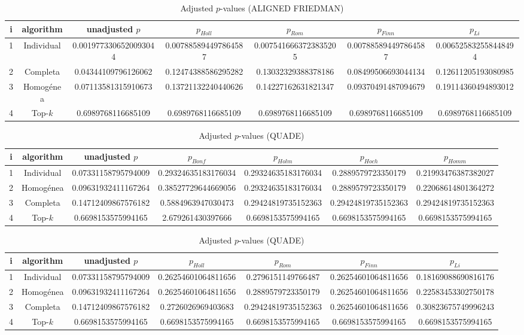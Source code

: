 \documentclass[a4paper,10pt]{article}
\begin{document}
\begin{landscape}
\begin{table}[!htp]
\centering\scriptsize
\caption{Adjusted $p$-values (ALIGNED FRIEDMAN)}
\begin{tabular}{ccccccc}
i&algorithm&unadjusted $p$&$p_{Holl}$&$p_{Rom}$&$p_{Finn}$&$p_{Li}$\\
\hline
1&Individual&0.0019773306520093044&0.007885894497864587&0.0075416663723835205&0.007885894497864587&0.006525832558448494\\
2&Completa&0.04344109796126062&0.12474388586295282&0.13032329388378186&0.08499506693044134&0.12611205193080985\\
3&Homogénea&0.07113581315910673&0.13721132240440626&0.14227162631821347&0.09370491487094679&0.19114360494893012\\
4&Top-$k$&0.6989768116685109&0.6989768116685109&0.6989768116685109&0.6989768116685109&0.6989768116685109\\
\hline
\end{tabular}
\end{table}


\newpage

\begin{table}[!htp]
\centering\scriptsize
\caption{Adjusted $p$-values (QUADE)}
\begin{tabular}{ccccccc}
i&algorithm&unadjusted $p$&$p_{Bonf}$&$p_{Holm}$&$p_{Hoch}$&$p_{Homm}$\\
\hline
1&Individual&0.07331158795794009&0.29324635183176034&0.29324635183176034&0.2889579723350179&0.21993476387382027\\
2&Homogénea&0.09631932411167264&0.38527729644669056&0.29324635183176034&0.2889579723350179&0.22068614801364272\\
3&Completa&0.14712409867576182&0.5884963947030473&0.29424819735152363&0.29424819735152363&0.29424819735152363\\
4&Top-$k$&0.6698153575994165&2.679261430397666&0.6698153575994165&0.6698153575994165&0.6698153575994165\\
\hline
\end{tabular}
\end{table}

\begin{table}[!htp]
\centering\scriptsize
\caption{Adjusted $p$-values (QUADE)}
\begin{tabular}{ccccccc}
i&algorithm&unadjusted $p$&$p_{Holl}$&$p_{Rom}$&$p_{Finn}$&$p_{Li}$\\
\hline
1&Individual&0.07331158795794009&0.26254601064811656&0.2796151149766487&0.26254601064811656&0.18169088690816176\\
2&Homogénea&0.09631932411167264&0.26254601064811656&0.2889579723350179&0.26254601064811656&0.22583453302750178\\
3&Completa&0.14712409867576182&0.2726026969403683&0.29424819735152363&0.26254601064811656&0.30823675749996243\\
4&Top-$k$&0.6698153575994165&0.6698153575994165&0.6698153575994165&0.6698153575994165&0.6698153575994165\\
\hline
\end{tabular}
\end{table}

\end{landscape}
\end{document}

